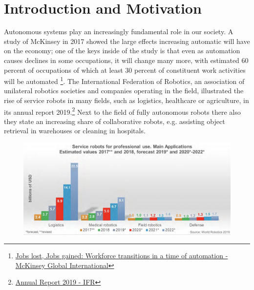 \chapter{Introduction and Motivation}
\label{text:introduction}
Autonomous systems play an increasingly fundamental role in our society. A study of McKinsey in 2017 showed the large effects increasing automatic will have on the economy; one of the keys inside of the study is that even as automation causes declines in some occupations, it will change many more, with estimated 60 percent of occupations of which at least 30 percent of constituent work activities will be automated \footnote{\href{https://www.mckinsey.com/~/media/McKinsey/Featured\%20Insights/Future\%20of\%20Organizations/What\%20the\%20future\%20of\%20work\%20will\%20mean\%20for\%20jobs\%20skills\%20and\%20wages/MGI-Jobs-Lost-Jobs-Gained-Report-December-6-2017.ashx}{Jobs lost, Jobs gained: Workforce transitions in a time of automation - McKinsey Global International}}. The International Federation of Robotics, an association of unilateral robotics societies and companies operating in the field, illustrated the rise of service robots in many fields, such as logistics, healthcare or agriculture, in its annual report 2019.\footnote{\href{https://ifr.org/downloads/press2018/IFR\%20World\%20Robotics\%20Presentation\%20-\%2018\%20Sept\%202019.pdf}{Annual Report 2019 - IFR}} Next to the field of fully autonomous robots there also they state an increasing share of collaborative robots, e.g. assisting object retrieval in warehouses or cleaning in hospitals.

\begin{figure}[!ht]
\begin{center}
\includegraphics[width=\imgwidth]{images/service_robotics.png}
\label{img:service_robotics}
\end{center}
\end{figure}

